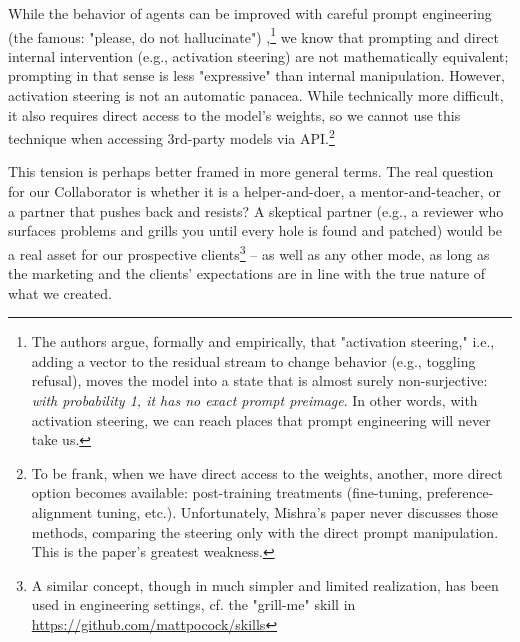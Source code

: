 While the behavior of agents can be improved with careful prompt engineering (the famous: "please, do not hallucinate") \cite{2604.09839},\footnote{%
    The authors argue, formally and empirically, that "activation steering," i.e., adding a vector to the residual stream to change behavior (e.g., toggling refusal), moves the model into a state that is almost surely non-surjective: \emph{with probability 1, it has no exact prompt preimage}. In other words, with activation steering, we can reach places that prompt engineering will never take us.
    }
we know that prompting and direct internal intervention (e.g., activation steering) are not mathematically equivalent; prompting in that sense is less "expressive" than internal manipulation. However, activation steering is not an automatic panacea. While technically more difficult, it also requires direct access to the model's weights, so we cannot use this technique when accessing 3rd-party models via API.\footnote{
    To be frank, when we have direct access to the weights, another, more direct option becomes available: post-training treatments (fine-tuning, preference-alignment tuning, etc.). Unfortunately, Mishra's paper never discusses those methods, comparing the steering only with the direct prompt manipulation. This is the paper's greatest weakness.
}

This tension is perhaps better framed in more general terms. The real question for our Collaborator is whether it is a helper-and-doer, a mentor-and-teacher, or a partner that pushes back and resists?  A skeptical partner (e.g., a reviewer who surfaces problems and grills you until every hole is found and patched) would be a real asset for our prospective clients\footnote{%
    A similar concept, though in much simpler and limited realization, has been used in engineering settings, cf. the "grill-me" skill in \url{https://github.com/mattpocock/skills}}
-- as well as any other mode, as long as the marketing and the clients' expectations are in line with the true nature of what we created.

